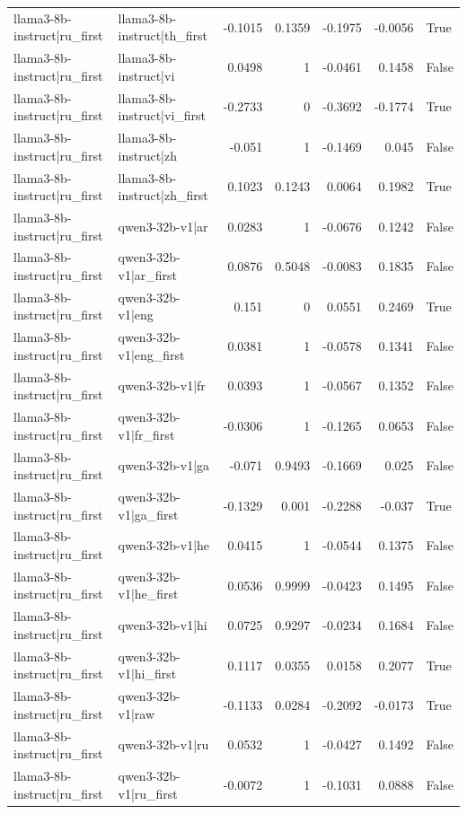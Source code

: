 \begin{table}
\begin{tabular}{l l r r r r l}
llama3-8b-instruct|ru_first & llama3-8b-instruct|th_first & -0.1015 & 0.1359 & -0.1975 & -0.0056 & True \\
llama3-8b-instruct|ru_first & llama3-8b-instruct|vi & 0.0498 & 1 & -0.0461 & 0.1458 & False \\
llama3-8b-instruct|ru_first & llama3-8b-instruct|vi_first & -0.2733 & 0 & -0.3692 & -0.1774 & True \\
llama3-8b-instruct|ru_first & llama3-8b-instruct|zh & -0.051 & 1 & -0.1469 & 0.045 & False \\
llama3-8b-instruct|ru_first & llama3-8b-instruct|zh_first & 0.1023 & 0.1243 & 0.0064 & 0.1982 & True \\
llama3-8b-instruct|ru_first & qwen3-32b-v1|ar & 0.0283 & 1 & -0.0676 & 0.1242 & False \\
llama3-8b-instruct|ru_first & qwen3-32b-v1|ar_first & 0.0876 & 0.5048 & -0.0083 & 0.1835 & False \\
llama3-8b-instruct|ru_first & qwen3-32b-v1|eng & 0.151 & 0 & 0.0551 & 0.2469 & True \\
llama3-8b-instruct|ru_first & qwen3-32b-v1|eng_first & 0.0381 & 1 & -0.0578 & 0.1341 & False \\
llama3-8b-instruct|ru_first & qwen3-32b-v1|fr & 0.0393 & 1 & -0.0567 & 0.1352 & False \\
llama3-8b-instruct|ru_first & qwen3-32b-v1|fr_first & -0.0306 & 1 & -0.1265 & 0.0653 & False \\
llama3-8b-instruct|ru_first & qwen3-32b-v1|ga & -0.071 & 0.9493 & -0.1669 & 0.025 & False \\
llama3-8b-instruct|ru_first & qwen3-32b-v1|ga_first & -0.1329 & 0.001 & -0.2288 & -0.037 & True \\
llama3-8b-instruct|ru_first & qwen3-32b-v1|he & 0.0415 & 1 & -0.0544 & 0.1375 & False \\
llama3-8b-instruct|ru_first & qwen3-32b-v1|he_first & 0.0536 & 0.9999 & -0.0423 & 0.1495 & False \\
llama3-8b-instruct|ru_first & qwen3-32b-v1|hi & 0.0725 & 0.9297 & -0.0234 & 0.1684 & False \\
llama3-8b-instruct|ru_first & qwen3-32b-v1|hi_first & 0.1117 & 0.0355 & 0.0158 & 0.2077 & True \\
llama3-8b-instruct|ru_first & qwen3-32b-v1|raw & -0.1133 & 0.0284 & -0.2092 & -0.0173 & True \\
llama3-8b-instruct|ru_first & qwen3-32b-v1|ru & 0.0532 & 1 & -0.0427 & 0.1492 & False \\
llama3-8b-instruct|ru_first & qwen3-32b-v1|ru_first & -0.0072 & 1 & -0.1031 & 0.0888 & False \\

\end{tabular}
\end{table}
